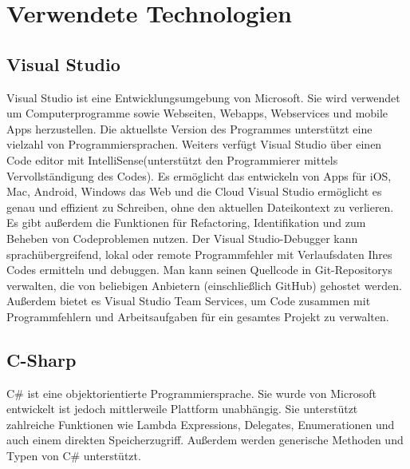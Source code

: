\chapter{Verwendete Technologien}\label{cha:theoretical-background}

\section{Visual Studio}
Visual Studio ist eine Entwicklungsumgebung von Microsoft. Sie wird verwendet um Computerprogramme sowie Webseiten, Webapps, Webservices und mobile Apps herzustellen. Die aktuellste Version des Programmes unterstützt eine vielzahl von Programmiersprachen.
Weiters verfügt Visual Studio über einen Code editor mit IntelliSense(unterstützt den Programmierer mittels Vervollständigung des Codes). Es ermöglicht das entwickeln von Apps für iOS, Mac, Android, Windows das Web und die Cloud
Visual Studio ermöglicht es genau und effizient zu Schreiben, ohne den aktuellen Dateikontext zu verlieren. Es gibt außerdem die Funktionen für Refactoring, Identifikation und zum Beheben von Codeproblemen nutzen.
Der Visual Studio-Debugger kann sprachübergreifend, lokal oder remote Programmfehler mit Verlaufsdaten Ihres Codes ermitteln und debuggen.
Man kann seinen Quellcode in Git-Repositorys verwalten, die von beliebigen Anbietern (einschließlich GitHub) gehostet werden. Außerdem bietet es Visual Studio Team Services, um Code zusammen mit Programmfehlern und Arbeitsaufgaben für ein gesamtes Projekt zu verwalten.

\section{C-Sharp}
C\# ist eine objektorientierte Programmiersprache. Sie wurde von Microsoft entwickelt ist jedoch mittlerweile Plattform unabhängig. Sie unterstützt zahlreiche Funktionen wie Lambda Expressions, Delegates, Enumerationen und auch einem direkten Speicherzugriff. Außerdem werden generische Methoden und Typen von C\# unterstützt.


